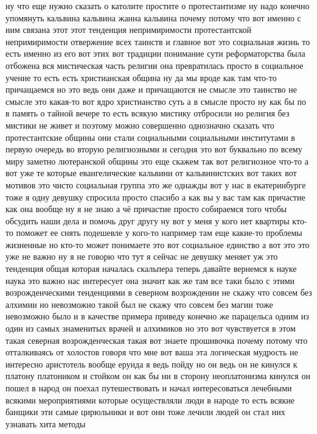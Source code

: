 ну что еще нужно сказать о католите
простите о протестантизме ну надо конечно упомянуть кальвина кальвина жанна
кальвина почему потому что вот именно с ним связана этот этот тенденция
непримиримости протестантской непримиримости отвержение всех таинств и главное
вот это социальная жизнь то есть именно из его вот этих вот традиции понимание
сути реформаторства была отбожена вся мистическая часть религии она превратилась
просто в социальное учение то есть есть христианская община ну да мы вроде как
там что-то причащаемся но это ведь они даже и причащаются не смысле это таинство
не смысле это какая-то вот ядро христианство суть а в смысле просто ну как бы по
в память о тайной вечере то есть всякую мистику отбросили но религия без мистики
не живет и поэтому можно совершенно однозначно сказать что протестантские общины
они стали социальными социальными институтами в первую очередь во вторую
религиозными и сегодня это вот буквально по всему миру заметно лютеранской
общины это еще скажем так вот религиозное что-то а вот уже те которые
евангелические кальвини от кальвинистских вот таких вот мотивов это чисто
социальная группа это же однажды вот у нас в екатеринбурге тоже я одну девушку
спросила просто спасибо а как вы у вас там как причастие как она вообще ну я не
знаю а чё причастие просто собираемся того чтобы обсудить наши дела и помочь
друг другу ну вот у меня у кого нет квартиры кто-то поможет ее снять подешевле у
кого-то например там еще какие-то проблемы жизненные но кто-то может понимаете
это вот социальное единство а вот это это уже не важно ну я не говорю что тут я
сейчас не девушку меняет уж это тенденция общая которая началась скальпера
теперь давайте вернемся к науке наука это важно нас интересует она значит как же
там все таки было с этими возрожденческими тенденциями в северном возрождении не
скажу что совсем без алхимии но невозможно такой был не скажу что совсем без
магии тоже невозможно было и в качестве примера приведу конечно же парацельса
одним из один из самых знаменитых врачей и алхимиков но это вот чувствуется в
этом такая северная возрожденческая такая вот знаете прошивочка почему потому
что отталкиваясь от холостов говоря что мне вот ваша эта логическая мудрость не
интересно аристотель вообще ерунда я ведь пойду но он ведь он не кинулся к
платону платоником и стойком он как бы ни в сторону неоплатонизма кинулся он
пошел в народ он поехал путешествовать и начал интересоваться лечебными всякими
мероприятиями которые осуществляли люди в народе то есть всякие банщики эти
самые цирюльники и вот они тоже лечили людей он стал них узнавать хита методы
